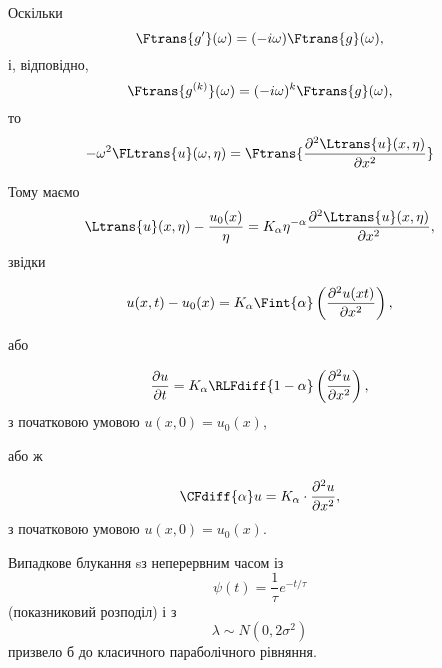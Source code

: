 Оскільки
\begin{equation}
    \Ftrans{g'}(\omega) = (-i \omega) \Ftrans{g}(\omega),
\end{equation}
і, відповідно,
\begin{equation}
    \Ftrans{g^{(k)}}(\omega) = (-i \omega)^k \Ftrans{g}(\omega),
\end{equation}
то
\begin{equation}
    - \omega^2 \FLtrans{u}(\omega, \eta) = \Ftrans{\frac{\partial^2 \Ltrans{u}(x,\eta)}{\partial x^2}}
\end{equation}

Тому маємо
\begin{equation}
    \Ltrans{u}(x,\eta) - \frac{u_0(x)}{\eta} = K_\alpha \eta^{-\alpha} \frac{\partial^2 \Ltrans{u}(x,\eta)}{\partial x^2},
\end{equation}
звідки
\begin{th_equation}
    \nothing
    \begin{equation}
        u(x, t) - u_0(x) = K_\alpha \Fint{\alpha} \left( \frac{\partial^2 u(x t)}{\partial x^2} \right),
    \end{equation}
\end{th_equation}
або
\begin{th_equation}
    \nothing
    \begin{equation}
        \frac{\partial u}{\partial t} = K_\alpha \RLFdiff{1 - \alpha} \left(\frac{\partial^2 u}{\partial x^2}\right),
    \end{equation}
    з початковою умовою $u(x, 0) = u_0(x)$, 
\end{th_equation}
або ж
\begin{th_equation}
    \nothing
    \begin{equation}
        \CFdiff{\alpha} u = K_\alpha \cdot \frac{\partial^2 u}{\partial x^2},
    \end{equation}
    з початковою умовою $u(x, 0) = u_0(x)$.
\end{th_equation}

\begin{remark}
    Випадкове блукання sз неперервним часом із
    \begin{equation}
        \psi(t) = \frac{1}{\tau} e^{-t/\tau}
    \end{equation}
    (показниковий розподіл) і з
    \begin{equation}
        \lambda \sim N(0, 2 \sigma^2)
    \end{equation}
    призвело б до класичного параболічного рівняння.
\end{remark}

